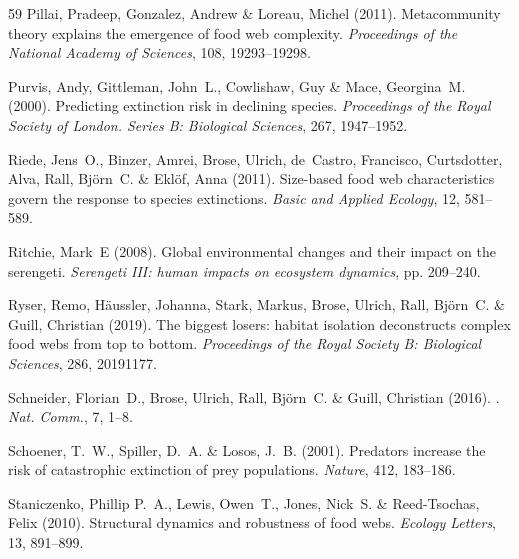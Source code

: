 \documentclass[11pt]{article}
\begin{document}
\begin{thebibliography}{59}
Pillai, Pradeep, Gonzalez, Andrew \& Loreau, Michel (2011).
\newblock Metacommunity theory explains the emergence of food web complexity.
\newblock \emph{Proceedings of the National Academy of Sciences}, 108,
  19293--19298.

Purvis, Andy, Gittleman, John~L., Cowlishaw, Guy \& Mace, Georgina~M. (2000).
\newblock Predicting extinction risk in declining species.
\newblock \emph{Proceedings of the Royal Society of London. Series B:
  Biological Sciences}, 267, 1947--1952.

Riede, Jens~O., Binzer, Amrei, Brose, Ulrich, de~Castro, Francisco,
  Curtsdotter, Alva, Rall, Björn~C. \& Eklöf, Anna (2011).
\newblock Size-based food web characteristics govern the response to species
  extinctions.
\newblock \emph{Basic and Applied Ecology}, 12, 581--589.

Ritchie, Mark~E (2008).
\newblock Global environmental changes and their impact on the serengeti.
\newblock \emph{Serengeti III: human impacts on ecosystem dynamics}, pp.
  209--240.

Ryser, Remo, Häussler, Johanna, Stark, Markus, Brose, Ulrich, Rall, Björn~C.
  \& Guill, Christian (2019).
\newblock The biggest losers: habitat isolation deconstructs complex food webs
  from top to bottom.
\newblock \emph{Proceedings of the Royal Society B: Biological Sciences}, 286,
  20191177.

Schneider, Florian~D., Brose, Ulrich, Rall, Björn~C. \& Guill, Christian
  (2016).
.
\newblock \emph{Nat. Comm.}, 7, 1--8.

Schoener, T.~W., Spiller, D.~A. \& Losos, J.~B. (2001).
\newblock Predators increase the risk of catastrophic extinction of prey
  populations.
\newblock \emph{Nature}, 412, 183--186.

Staniczenko, Phillip P.~A., Lewis, Owen~T., Jones, Nick~S. \& Reed-Tsochas,
  Felix (2010).
\newblock Structural dynamics and robustness of food webs.
\newblock \emph{Ecology Letters}, 13, 891--899.


\end{thebibliography}
\end{document}
